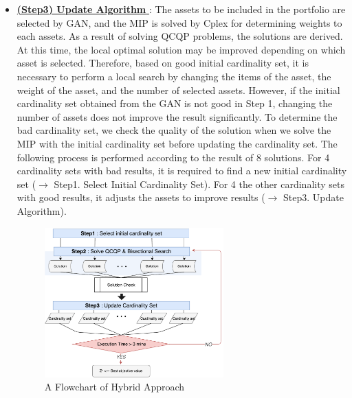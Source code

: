 \documentclass[11pt]{article}
\begin{document}
\begin{itemize}
	\item[]\underline{\textbf{(Step3) Update Algorithm }} :  The assets to be included in the portfolio are selected by GAN, and the MIP is solved by Cplex for determining weights to each assets. 
	As a result of solving QCQP problems, the solutions are derived. At this time, the local optimal solution may be improved depending on which asset is selected. Therefore, based on good initial cardinality set, it is necessary to perform a local search by changing the items of the asset, the weight of the asset, and the number of selected assets. However, if the initial cardinality set obtained from the GAN is not good in Step 1, changing the number of assets does not improve the result significantly. To determine the bad cardinality set, we check the quality of the solution when we solve the MIP with the initial cardinality set before updating the cardinality set. The following process is performed according to the result of 8 solutions. For 4 cardinality sets with bad results, it is required to find a new initial cardinality set ($\rightarrow$ Step1. Select Initial Cardinality Set). For 4 the other cardinality sets with good results, it adjusts the assets to improve results ($\rightarrow$ Step3. Update Algorithm). 
	
	
	\begin{figure}[h] 
		\begin{center}
			\includegraphics[width=0.65\textwidth]{step3}
			\caption{A Flowchart of Hybrid Approach} \label{fig:step3}
		\end{center}
	\end{figure}
	

\end{itemize}
\end{document}
